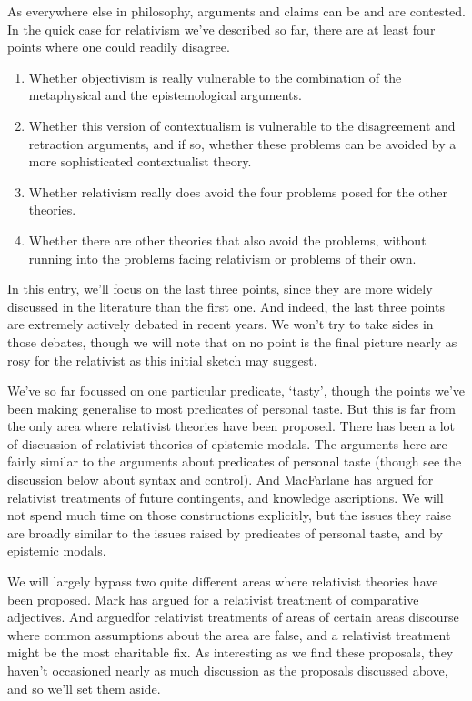 As everywhere else in philosophy, arguments and claims can be and are contested. In the quick case for relativism we've described so far, there are at least four points where one could readily disagree.

\begin{enumerate}
\item Whether objectivism is really vulnerable to the combination of the metaphysical and the epistemological arguments.

\item Whether this version of contextualism is vulnerable to the disagreement and retraction arguments, and if so, whether these problems can be avoided by a more sophisticated contextualist theory.

\item Whether relativism really does avoid the four problems posed for the other theories.

\item Whether there are other theories that also avoid the problems, without running into the problems facing relativism or problems of their own.

\end{enumerate}
In this entry, we'll focus on the last three points, since they are more widely discussed in the literature than the first one. And indeed, the last three points are extremely actively debated in recent years. We won't try to take sides in those debates, though we will note that on no point is the final picture nearly as rosy for the relativist as this initial sketch may suggest.

We've so far focussed on one particular predicate, `tasty', though the points we've been making generalise to most predicates of personal taste. But this is far from the only area where relativist theories have been proposed. There has been a lot of discussion of relativist theories of epistemic modals. The arguments here are fairly similar to the arguments about predicates of personal taste (though see the discussion below about syntax and control). And MacFarlane has argued for relativist treatments of future contingents, and knowledge ascriptions. We will not spend much time on those constructions explicitly, but the issues they raise are broadly similar to the issues raised by predicates of personal taste, and by epistemic modals.

We will largely bypass two quite different areas where relativist theories have been proposed. Mark  \citet{Richard2008} has argued for a relativist treatment of comparative adjectives. And  \citet{Weatherson2011-NoRoyal} arguedfor relativist treatments of areas of certain areas discourse where common assumptions about the area are false, and a relativist treatment might be the most charitable fix. As interesting as we find these proposals, they haven't occasioned nearly as much discussion as the proposals discussed above, and so we'll set them aside.

